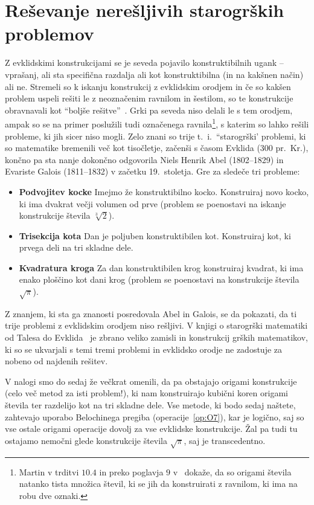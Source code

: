 \section{Reševanje nerešljivih starogrških problemov}
\label{pogl:starogrskiproblemi}

Z evklidskimi konstrukcijami se je seveda pojavilo konstruktibilnih ugank -- vprašanj, ali sta specifična razdalja ali kot konstruktibilna (in na kakšnen način) ali ne. Stremeli so k iskanju konstrukcij z evklidskim orodjem in če so kakšen problem uspeli rešiti le z neoznačenim ravnilom in šestilom, so te konstrukcije obravnavali kot ``boljše rešitve''~\cite[str. 36]{royster2002}. Grki pa seveda niso delali le s tem orodjem, ampak so se na primer poslužili tudi označenega ravnila\footnote{Martin v trditvi $10.4$ in preko poglavja $9$ v~\cite{geometricconstructions} dokaže, da so origami števila natanko tista množica števil, ki se jih da konstruirati z ravnilom, ki ima na robu dve oznaki.}, s katerim so lahko rešili probleme, ki jih sicer niso mogli. Zelo znani so trije t.\ i.\ ``starogrški' problemi, ki so matematike bremenili več kot tisočletje, začenši s časom Evklida (300 pr.\ Kr.), končno pa sta nanje dokončno odgovorila Niels Henrik Abel (1802--1829) in Evariste Galois (1811--1832) v začetku 19.\ stoletja. Gre za sledeče tri probleme:
\begin{itemize}
    \item \textbf{Podvojitev kocke} Imejmo že konstruktibilno kocko. Konstruiraj novo kocko, ki ima dvakrat večji volumen od prve (problem se poenostavi na iskanje konstrukcije števila $\sqrt[3]{2}$).
    \item \textbf{Trisekcija kota} Dan je poljuben konstruktibilen kot. Konstruiraj kot, ki prvega deli na tri skladne dele.
    \item \textbf{Kvadratura kroga} Za dan konstruktibilen krog konstruiraj kvadrat, ki ima enako ploščino kot dani krog (problem se poenostavi na konstrukcije števila $\sqrt{\pi}$).
\end{itemize}

Z znanjem, ki sta ga znanosti posredovala Abel in Galois, se da pokazati, da ti trije problemi z evklidskim orodjem niso rešljivi. V knjigi o starogrški matematiki od Talesa do Evklida~\cite[str.\ 218--270]{heath1921} je zbrano veliko zamisli in konstrukcij grških matematikov, ki so se ukvarjali s temi tremi problemi in evklidsko orodje ne zadostuje za nobeno od najdenih rešitev.

V nalogi smo do sedaj že večkrat omenili, da pa obstajajo origami konstrukcije (celo več metod za isti problem!), ki nam konstruirajo kubični koren origami števila ter razdelijo kot na tri skladne dele. Vse metode, ki bodo sedaj naštete, zahtevajo uporabo Belochinega pregiba (operacije~\ref{op:O7}), kar je logično, saj so vse ostale origami operacije dovolj za vse evklidske konstrukcije. Žal pa tudi tu ostajamo nemočni glede konstrukcije števila $\sqrt{\pi}$, saj je transcedentno.

